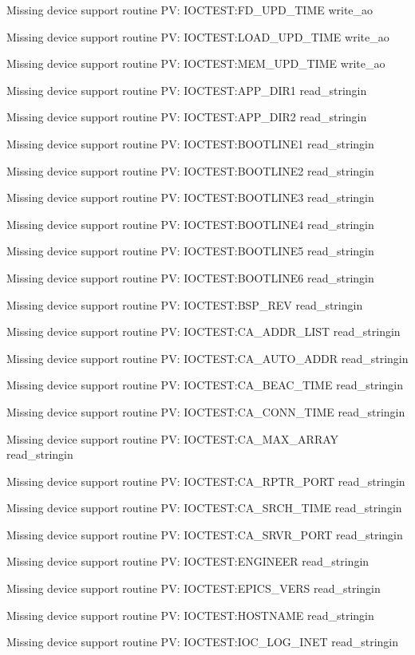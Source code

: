 Missing device support routine PV: IOCTEST:FD_UPD_TIME write_ao

Missing device support routine PV: IOCTEST:LOAD_UPD_TIME write_ao

Missing device support routine PV: IOCTEST:MEM_UPD_TIME write_ao

Missing device support routine PV: IOCTEST:APP_DIR1 read_stringin

Missing device support routine PV: IOCTEST:APP_DIR2 read_stringin

Missing device support routine PV: IOCTEST:BOOTLINE1 read_stringin

Missing device support routine PV: IOCTEST:BOOTLINE2 read_stringin

Missing device support routine PV: IOCTEST:BOOTLINE3 read_stringin

Missing device support routine PV: IOCTEST:BOOTLINE4 read_stringin

Missing device support routine PV: IOCTEST:BOOTLINE5 read_stringin

Missing device support routine PV: IOCTEST:BOOTLINE6 read_stringin

Missing device support routine PV: IOCTEST:BSP_REV read_stringin

Missing device support routine PV: IOCTEST:CA_ADDR_LIST read_stringin

Missing device support routine PV: IOCTEST:CA_AUTO_ADDR read_stringin

Missing device support routine PV: IOCTEST:CA_BEAC_TIME read_stringin

Missing device support routine PV: IOCTEST:CA_CONN_TIME read_stringin

Missing device support routine PV: IOCTEST:CA_MAX_ARRAY read_stringin

Missing device support routine PV: IOCTEST:CA_RPTR_PORT read_stringin

Missing device support routine PV: IOCTEST:CA_SRCH_TIME read_stringin

Missing device support routine PV: IOCTEST:CA_SRVR_PORT read_stringin

Missing device support routine PV: IOCTEST:ENGINEER read_stringin

Missing device support routine PV: IOCTEST:EPICS_VERS read_stringin

Missing device support routine PV: IOCTEST:HOSTNAME read_stringin

Missing device support routine PV: IOCTEST:IOC_LOG_INET read_stringin

